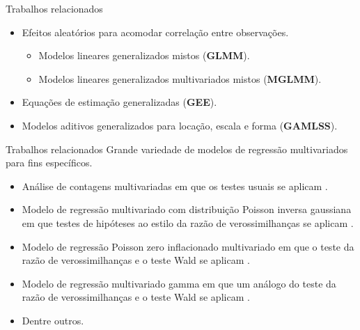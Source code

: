 \documentclass[
  ignorenonframetext,
  serif,
  professionalfont,
  usenames,
  dvipsnames,
  aspectratio = 169]{beamer}
\begin{document}
\begin{frame}{Trabalhos relacionados}
\protect\hypertarget{trabalhos-relacionados-2}{}
\begin{itemize}
  \itemsep 2ex
  
  \item Efeitos aleatórios para acomodar correlação entre observações.
    \begin{itemize}
      \item Modelos lineares generalizados mistos (\textbf{GLMM}).
      \item Modelos lineares generalizados multivariados mistos (\textbf{MGLMM}).
    \end{itemize}

  \item Equações de estimação generalizadas (\textbf{GEE}).

  \item Modelos aditivos generalizados para locação, escala e forma (\textbf{GAMLSS}).
  
\end{itemize}
\end{frame}

\begin{frame}{Trabalhos relacionados}
\protect\hypertarget{trabalhos-relacionados-3}{}
Grande variedade de modelos de regressão multivariados para fins
específicos.

\begin{itemize}
  
  \item Análise de contagens multivariadas em que os testes usuais se aplicam \citep{zhang2017regression}.  

  \item Modelo de regressão multivariado com distribuição Poisson inversa gaussiana em que testes de hipóteses ao estilo da razão de verossimilhanças se aplicam \citep{mardalena2020parameter}. 

  \item Modelo de regressão Poisson zero inflacionado multivariado em que o teste da razão de verossimilhanças e o teste Wald se aplicam \citep{sari2021estimation}.
  
  \item Modelo de regressão multivariado gamma em que um análogo do teste da razão de verossimilhanças e o teste Wald se aplicam \citep{rahayu2020multivariate}.

  \item Dentre outros.
  
\end{itemize}
\end{frame}
\end{document}
